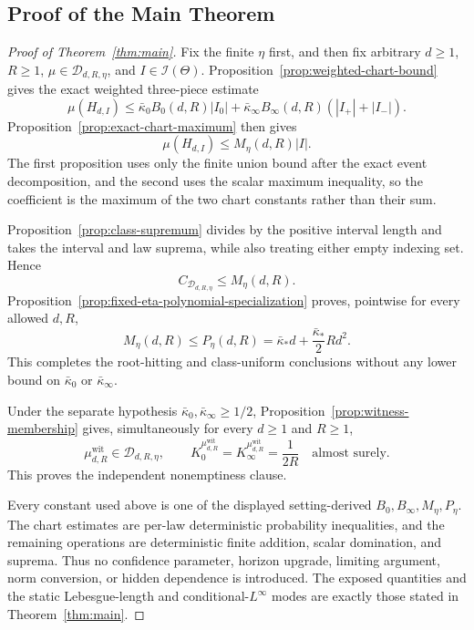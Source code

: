 \subsection{Proof of the Main Theorem}
\label{app:main-proof}

\begin{proof}[Proof of Theorem~\ref{thm:main}]
Fix the finite $\eta$ first, and then fix arbitrary $d\geq1$, $R\geq1$,
$\mu\in\mathcal D_{d,R,\eta}$, and $I\in\mathcal I(\Theta)$.
Proposition~\ref{prop:weighted-chart-bound} gives the exact weighted
three-piece estimate
\[
\mu(H_{d,I})
\leq\bar\kappa_0B_0(d,R)|I_0|
 +\bar\kappa_\infty B_\infty(d,R)(|I_+|+|I_-|).
\]
Proposition~\ref{prop:exact-chart-maximum} then gives
\[
\mu(H_{d,I})\leq M_\eta(d,R)|I|.
\]
The first proposition uses only the finite union bound after the exact event
decomposition, and the second uses the scalar maximum inequality, so the
coefficient is the maximum of the two chart constants rather than their sum.

Proposition~\ref{prop:class-supremum} divides by the positive interval length
and takes the interval and law suprema, while also treating either empty
indexing set.  Hence
\[
C_{\mathcal D_{d,R,\eta}}\leq M_\eta(d,R).
\]
Proposition~\ref{prop:fixed-eta-polynomial-specialization} proves, pointwise
for every allowed $d,R$,
\[
M_\eta(d,R)\leq P_\eta(d,R)
=\bar\kappa_*d+\frac{\bar\kappa_*}{2}Rd^2.
\]
This completes the root-hitting and class-uniform conclusions without any
lower bound on $\bar\kappa_0$ or $\bar\kappa_\infty$.

Under the separate hypothesis
$\bar\kappa_0,\bar\kappa_\infty\geq1/2$,
Proposition~\ref{prop:witness-membership} gives, simultaneously for every
$d\geq1$ and $R\geq1$,
\[
\mu^{\mathrm{wit}}_{d,R}\in\mathcal D_{d,R,\eta},
\qquad
K_0^{\mu^{\mathrm{wit}}_{d,R}}
=K_\infty^{\mu^{\mathrm{wit}}_{d,R}}
=\frac1{2R}\quad\text{almost surely}.
\]
This proves the independent nonemptiness clause.

Every constant used above is one of the displayed setting-derived
$B_0,B_\infty,M_\eta,P_\eta$.  The chart estimates are per-law deterministic
probability inequalities, and the remaining operations are deterministic
finite addition, scalar domination, and suprema.  Thus no confidence
parameter, horizon upgrade, limiting argument, norm conversion, or hidden
dependence is introduced.  The exposed quantities and the static
Lebesgue-length and conditional-$L^\infty$ modes are exactly those stated in
Theorem~\ref{thm:main}.
\end{proof}
